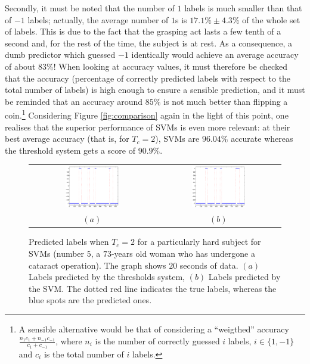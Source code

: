 \documentclass[a4paper,10pt,conference]{ieeeconf}
\begin{document}
Secondly, it must be noted that the number of $1$ labels is much
smaller than that of $-1$ labels; actually, the average number of $1$s
is $17.1\% \pm 4.3\%$ of the whole set of labels. This is due to the
fact that the grasping act lasts a few tenth of a second and, for the
rest of the time, the subject is at rest.  As a consequence, a dumb
predictor which guessed $-1$ identically would achieve an average
accuracy of about $83\%$! When looking at accuracy values, it must
therefore be checked that the accuracy (percentage of correctly
predicted labels with respect to the total number of labels) is high
enough to ensure a sensible prediction, and it must be reminded that
an accuracy around $85\%$ is not much better than flipping a
coin.\footnote{A sensible alternative would be that of considering a
``weigthed'' accuracy $\frac{n_1 c_1 + n_{-1} c_{-1}}{c_1+c_{-1}}$,
where $n_i$ is the number of correctly guessed $i$ labels, $i \in
\{1,-1\}$ and $c_i$ is the total number of $i$ labels.} Considering
Figure \ref{fig:comparison} again in the light of this point, one
realises that the superior performance of SVMs is even more relevant:
at their best average accuracy (that is, for $T_c=2$), SVMs are
$96.04\%$ accurate whereas the threshold system gets a score of
$90.9\%$.

\begin{figure}[!t]
  \begin{center}
    \begin{tabular}{cc}
      \includegraphics[width=0.45\textwidth]{predictionT.eps} &
      \includegraphics[width=0.45\textwidth]{predictionS.eps} \\
      $(a)$ & $(b)$
    \end{tabular}
    \caption{Predicted labels when $T_c=2$ for a particularly hard
    subject for SVMs (number $5$, a $73$-years old woman who has
    undergone a cataract operation). The graph shows $20$ seconds of
    data. $(a)$ Labels predicted by the thresholds system, $(b)$
    Labels predicted by the SVM. The dotted red line indicates the
    true labels, whereas the blue spots are the predicted ones.}
    \label{fig:prediction}
  \end{center}
\end{figure}
\end{document}
